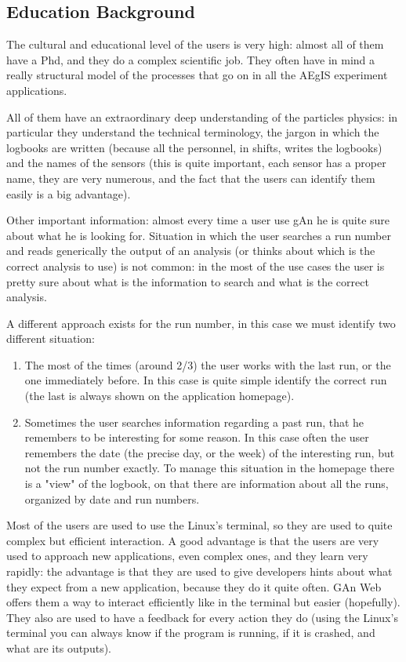 \subsection{Education Background}
The cultural and educational level of the users is very high: almost all of them have a Phd, and they do a complex scientific job. They often have in mind a really structural model of the processes that go on in all the AEgIS experiment applications.

All of them have an extraordinary deep understanding of the particles physics: in particular they understand the technical terminology, the jargon in which the logbooks are written (because all the personnel, in shifts, writes the logbooks) and the names of the sensors (this is quite important, each sensor has a proper name, they are very numerous, and the fact that the users can identify them easily is a big advantage). 

Other important information: almost every time a user use gAn he is quite sure about what he is looking for. Situation in which the user searches a run number and reads generically the output of an analysis (or thinks about which is the correct analysis to use) is not common: in the most of the use cases the user is pretty sure about what is the information to search and what is the correct analysis. 

A different approach exists for the run number, in this case we must identify two different situation:

\begin{enumerate}

\item The most of the times (around 2/3) the user works with the last run, or the one immediately before. In this case is quite simple identify the correct run (the last is always shown on the application homepage).
\item Sometimes the user searches information regarding a past run, that he remembers to be interesting for some reason. In this case often the user remembers the date (the precise day, or the week) of the interesting run, but not the run number exactly. To manage this situation in the homepage there is a "view" of the logbook, on that there are information about all the runs, organized by date and run numbers. 

\end{enumerate}

Most of the users are used to use the Linux's terminal, so they are used to quite complex but efficient interaction. A good advantage is that the users are very used to approach new applications, even complex ones, and they learn very rapidly: the advantage is that they are used to give developers hints about what they expect from a new application, because they do it quite often. GAn Web offers them a way to interact efficiently like in the terminal but easier (hopefully). They also are used to have a feedback for every action they do (using the Linux's terminal you can always know if the program is running, if it is crashed, and what are its outputs).

